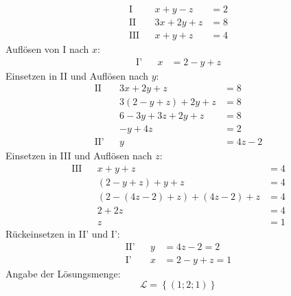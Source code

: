 \begin{bsp}[Einsetzungsverfahren]
  \begin{align*}
  \text{I} && x+y-z &= 2\\
  \text{II} && 3x+2y+z &= 8\\
  \text{III} && x+y+z &= 4
 \end{align*}
 Auflösen von I nach \(x\):
 \begin{align*}
  \text{I'} && x&= 2-y+z
 \end{align*}
 Einsetzen in II und Auflösen nach \(y\):
 \begin{align*}
  \text{II} && 3x+2y+z &= 8\\
  &&3(2-y+z)+2y+z &= 8 \\
  &&6-3y+3z+2y+z &= 8 \\
  &&  -y+4z &= 2 \\
  \text{II'}&&  y &= 4z-2
 \end{align*}
 Einsetzen in III und Auflösen nach \(z\):
 \begin{align*}
  \text{III} && x+y+z &= 4 \\
             && (2-y+z) + y +z &= 4\\
             && (2-(4z-2) +z) +(4z-2) +z &= 4\\
             && 2+2z &= 4 \\
             && z&=1
 \end{align*}
 Rückeinsetzen in II' und I':
 \begin{align*}
  \text{II'}&&  y &= 4z-2 = 2\\
  \text{I'} && x &= 2-y+z = 1
 \end{align*}
 Angabe der Lösungsmenge:
 \begin{equation*}
  \mathcal{L} = \left\lbrace (1;2;1) \right\rbrace
 \end{equation*}
\end{bsp}

